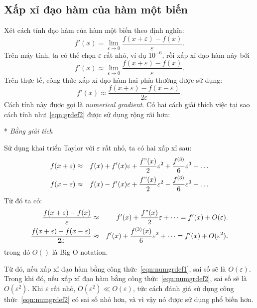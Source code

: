 \subsection{Xấp xỉ đạo hàm của hàm một biến}
\label{sub:xap_xi_dao_ham_cua_ham_mot_bien}
Xét cách tính đạo hàm của hàm một biến theo định nghĩa:
\begin{equation}
\label{eqn:grdef1}
f'(x) = \lim_{\varepsilon \rightarrow 0}\frac{f(x + \varepsilon) -
f(x)}{\varepsilon}.
\end{equation}
Trên máy tính, ta có thể chọn $\varepsilon$ rất nhỏ, ví dụ $10^{-6}$, rồi xấp xỉ đạo hàm này bởi
\begin{equation}
f'(x) \approx \lim_{\varepsilon \rightarrow 0}\frac{f(x + \varepsilon) -
f(x)}{\varepsilon}.
\end{equation}
Trên thực tế, công thức xấp xỉ đạo hàm hai phía thường được sử dụng:
\begin{equation}
\label{eqn:grdef2}
f'(x) \approx \frac{f(x + \varepsilon) - f(x - \varepsilon)}{2\varepsilon}.
\end{equation}
Cách tính này được gọi là \textit{numerical gradient}. Có hai cách giải thích việc tại sao cách tính như~\eqref{eqn:grdef2} được sử dụng rộng rãi hơn:

* \textit{Bằng giải tích}

Sử dụng khai triển Taylor với $\varepsilon$ rất nhỏ, ta có hai xấp xỉ sau:
\begin{eqnarray}
f(x + \varepsilon) &\approx& f(x) + f'(x)\varepsilon + \frac{f"(x)}{2}
\varepsilon^2 + \frac{f^{(3)}}{6}\varepsilon^3 + \dots \\
f(x - \varepsilon) &\approx& f(x) - f'(x)\varepsilon + \frac{f"(x)}{2}
\varepsilon^2 - \frac{f^{(3)}}{6}\varepsilon^3 + \dots
\end{eqnarray}
%
Từ đó ta có:
\begin{eqnarray}
\label{eqn:numgrdef1}
\frac{f(x + \varepsilon) - f(x)}{\varepsilon} &\approx& f'(x) +
\frac{f"(x)}{2}\varepsilon + \dots =  f'(x) + O(\varepsilon). \\
\label{eqn:numgrdef2}
\frac{f(x + \varepsilon) - f(x - \varepsilon)}{2\varepsilon} &\approx& f'(x) +
\frac{f^{(3)}(x)}{6}\varepsilon^2 + \dots =  f'(x) + O(\varepsilon^2).
\end{eqnarray}
trong đó $O()$ là {Big O notation}.

Từ đó, nếu xấp xỉ đạo hàm bằng công thức~\eqref{eqn:numgrdef1}, sai số sẽ là $O(\varepsilon)$. Trong khi đó, nếu xấp xỉ đạo hàm bằng công
thức~\eqref{eqn:numgrdef2}, sai số sẽ là
$O(\varepsilon^2)$. Khi $\varepsilon$ rất nhỏ, $O(\varepsilon^2) \ll
O(\varepsilon)$, tức cách đánh giá sử dụng công thức~\eqref{eqn:numgrdef2} có sai
số nhỏ hơn, và vì vậy nó được sử dụng phổ biến hơn.

